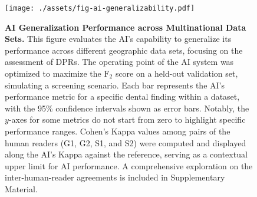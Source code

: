 \begin{figure}[!t]
    \centering
    \texttt{[image: ./assets/fig-ai-generalizability.pdf]}
    \caption{
        \textbf{AI Generalization Performance across Multinational Data Sets.}
        This figure evaluates the AI's capability to generalize its performance across different geographic data sets, focusing on the assessment of DPRs.
        The operating point of the AI system was optimized to maximize the $\textrm{F}_2$ score on a held-out validation set, simulating a screening scenario.
        Each bar represents the AI's performance metric for a specific dental finding within a dataset, with the 95\% confidence intervals shown as error bars.
        Notably, the $y$-axes for some metrics do not start from zero to highlight specific performance ranges.
        Cohen's Kappa values among pairs of the human readers (G1, G2, S1, and S2) were computed and displayed along the AI's Kappa against the reference, serving as a contextual upper limit for AI performance.
        A comprehensive exploration on the inter-human-reader agreements is included in Supplementary Material.
    }
    \label{fig:ai-generalizability}
\end{figure}